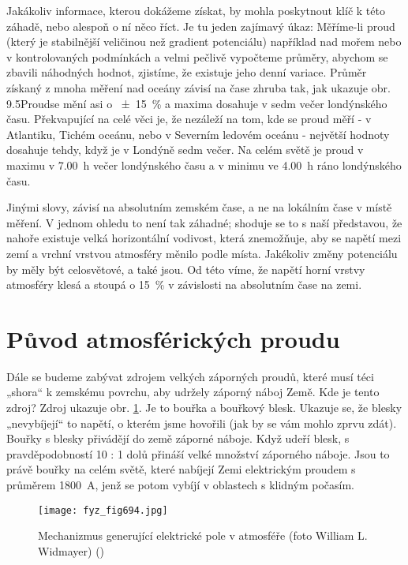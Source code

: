     Jakákoliv informace, kterou dokážeme získat, by mohla poskytnout klíč k této záhadě, nebo
    alespoň o ní něco říct. Je tu jeden zajímavý úkaz: Měříme-li proud (který je stabilnější
    veličinou než gradient potenciálu) například nad mořem nebo v kontrolovaných podmínkách a velmi
    pečlivě vypočteme průměry, abychom se zbavili náhodných hodnot, zjistíme, že existuje jeho denní
    variace. Průměr získaný z mnoha měření nad oceány závisí na čase zhruba tak, jak ukazuje obr.
    9.5Proudse mění asi o \SI{\pm15}{\percent} a maxima dosahuje v sedm večer londýnského času.
    Překvapující na celé věci je, že nezáleží na tom, kde se proud měří - v Atlantiku, Tichém
    oceánu, nebo v Severním ledovém oceánu - největší hodnoty dosahuje tehdy, když je v Londýně sedm
    večer. Na celém světě je proud v maximu v \SI{7.00}{\hour} večer londýnského času a v minimu ve
    \SI{4.00}{\hour} ráno londýnského času.

    Jinými slovy, závisí na absolutním zemském čase, a ne na lokálním čase v místě měření. V jednom
    ohledu to není tak záhadné; shoduje se to s naší představou, že nahoře existuje velká
    horizontální vodivost, která znemožňuje, aby se napětí mezi zemí a vrchní vrstvou atmosféry
    měnilo podle místa. Jakékoliv změny potenciálu by měly být celosvětové, a také jsou. Od této
    víme, že napětí horní vrstvy atmosféry klesá a stoupá o \SI{15}{\percent} v závislosti na
    absolutním čase na zemi.
  
  \section{Původ atmosférických proudu}\label{fyz:IIchapIXsecIII} 
  
    Dále se budeme zabývat zdrojem velkých záporných proudů, které musí téci „shora“ k zemskému
    povrchu, aby udržely záporný náboj Země. Kde je tento zdroj? Zdroj ukazuje obr.
    \ref{fyz:fig694}. Je to bouřka a bouřkový blesk. Ukazuje se, že blesky „nevybíjejí“ to napětí, o
    kterém jsme hovořili (jak by se vám mohlo zprvu zdát). Bouřky s blesky přivádějí do země záporné
    náboje. Když udeří blesk, s pravděpodobností 10 : 1 dolů přináší velké množství záporného
    náboje. Jsou to právě bouřky na celém světě, které nabíjejí Zemi elektrickým proudem s průměrem
    \SI{1800}{\A}, jenž se potom vybíjí v oblastech s klidným počasím.

    \begin{figure}[ht!] %
      \centering
      \texttt{[image: fyz\_fig694.jpg]}
      \caption{Mechanizmus generující elektrické pole v atmosféře (foto William L. Widmayer)
              (\cite[s.~707]{Feynman02})}
      \label{fyz:fig694}
    \end{figure}


